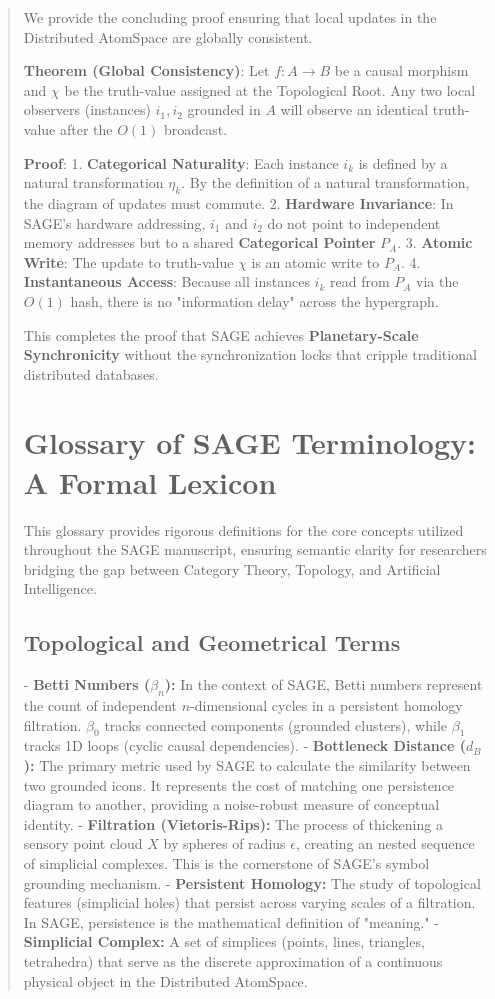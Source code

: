 \documentclass[10pt,twocolumn,letterpaper]{article}
\begin{document}
\begin{abstract}
We provide the concluding proof ensuring that local updates in the Distributed AtomSpace are globally consistent.

\textbf{Theorem (Global Consistency)}: Let $f: A \to B$ be a causal morphism and $\chi$ be the truth-value assigned at the Topological Root. Any two local observers (instances) $i_1, i_2$ grounded in $A$ will observe an identical truth-value after the $O(1)$ broadcast.

\textbf{Proof}:
1.  \textbf{Categorical Naturality}: Each instance $i_k$ is defined by a natural transformation $\eta_k$. By the definition of a natural transformation, the diagram of updates must commute.
2.  \textbf{Hardware Invariance}: In SAGE's hardware addressing, $i_1$ and $i_2$ do not point to independent memory addresses but to a shared \textbf{Categorical Pointer} $P_A$.
3.  \textbf{Atomic Write}: The update to truth-value $\chi$ is an atomic write to $P_A$.
4.  \textbf{Instantaneous Access}: Because all instances $i_k$ read from $P_A$ via the $O(1)$ hash, there is no "information delay" across the hypergraph. 

This completes the proof that SAGE achieves \textbf{Planetary-Scale Synchronicity} without the synchronization locks that cripple traditional distributed databases.


\section{Glossary of SAGE Terminology: A Formal Lexicon}

This glossary provides rigorous definitions for the core concepts utilized throughout the SAGE manuscript, ensuring semantic clarity for researchers bridging the gap between Category Theory, Topology, and Artificial Intelligence.

\subsection{Topological and Geometrical Terms}

- \textbf{Betti Numbers ($\beta_n$):} In the context of SAGE, Betti numbers represent the count of independent $n$-dimensional cycles in a persistent homology filtration. $\beta_0$ tracks connected components (grounded clusters), while $\beta_1$ tracks 1D loops (cyclic causal dependencies).
- \textbf{Bottleneck Distance ($d_B$):} The primary metric used by SAGE to calculate the similarity between two grounded icons. It represents the cost of matching one persistence diagram to another, providing a noise-robust measure of conceptual identity.
- \textbf{Filtration (Vietoris-Rips):} The process of thickening a sensory point cloud $X$ by spheres of radius $\epsilon$, creating an nested sequence of simplicial complexes. This is the cornerstone of SAGE's symbol grounding mechanism.
- \textbf{Persistent Homology:} The study of topological features (simplicial holes) that persist across varying scales of a filtration. In SAGE, persistence is the mathematical definition of "meaning."
- \textbf{Simplicial Complex:} A set of simplices (points, lines, triangles, tetrahedra) that serve as the discrete approximation of a continuous physical object in the Distributed AtomSpace.


\end{abstract}
\end{document}
